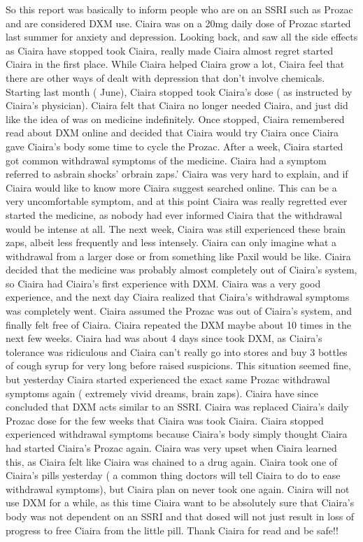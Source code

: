 \documentclass[12pt]{book}
\begin{document}
So this report was basically to inform people who are on an SSRI such as Prozac and are considered DXM use. Ciaira was on a 20mg daily dose of Prozac started last summer for anxiety and depression. Looking back, and saw all the side effects as Ciaira have stopped took Ciaira, really made Ciaira almost regret started Ciaira in the first place. While Ciaira helped Ciaira grow a lot, Ciaira feel that there are other ways of dealt with depression that don't involve chemicals. Starting last month ( June), Ciaira stopped took Ciaira's dose ( as instructed by Ciaira's physician). Ciaira felt that Ciaira no longer needed Ciaira, and just did like the idea of was on medicine indefinitely. Once stopped, Ciaira remembered read about DXM online and decided that Ciaira would try Ciaira once Ciaira gave Ciaira's body some time to cycle the Prozac. After a week, Ciaira started got common withdrawal symptoms of the medicine. Ciaira had a symptom referred to asbrain shocks' orbrain zaps.' Ciaira was very hard to explain, and if Ciaira would like to know more Ciaira suggest searched online. This can be a very uncomfortable symptom, and at this point Ciaira was really regretted ever started the medicine, as nobody had ever informed Ciaira that the withdrawal would be intense at all. The next week, Ciaira was still experienced these brain zaps, albeit less frequently and less intensely. Ciaira can only imagine what a withdrawal from a larger dose or from something like Paxil would be like. Ciaira decided that the medicine was probably almost completely out of Ciaira's system, so Ciaira had Ciaira's first experience with DXM. Ciaira was a very good experience, and the next day Ciaira realized that Ciaira's withdrawal symptoms was completely went. Ciaira assumed the Prozac was out of Ciaira's system, and finally felt free of Ciaira. Ciaira repeated the DXM maybe about 10 times in the next few weeks. Ciaira had was about 4 days since took DXM, as Ciaira's tolerance was ridiculous and Ciaira can't really go into stores and buy 3 bottles of cough syrup for very long before raised suspicions. This situation seemed fine, but yesterday Ciaira started experienced the exact same Prozac withdrawal symptoms again ( extremely vivid dreams, brain zaps). Ciaira have since concluded that DXM acts similar to an SSRI. Ciaira was replaced Ciaira's daily Prozac dose for the few weeks that Ciaira was took Ciaira. Ciaira stopped experienced withdrawal symptoms because Ciaira's body simply thought Ciaira had started Ciaira's Prozac again. Ciaira was very upset when Ciaira learned this, as Ciaira felt like Ciaira was chained to a drug again. Ciaira took one of Ciaira's pills yesterday ( a common thing doctors will tell Ciaira to do to ease withdrawal symptoms), but Ciaira plan on never took one again. Ciaira will not use DXM for a while, as this time Ciaira want to be absolutely sure that Ciaira's body was not dependent on an SSRI and that dosed will not just result in loss of progress to free Ciaira from the little pill. Thank Ciaira for read and be safe!!
\end{document}
